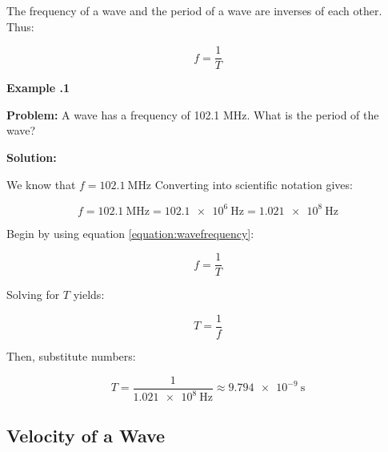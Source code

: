 	\newpage
	
	The frequency of a wave and the period of a wave are inverses of each other.  Thus:
	
	
	\begin{mdframed}[backgroundcolor=orange!20!white]
		\begin{equation}
		f = \frac{1}{T}
		\label{equation:wavefrequency}
		\end{equation}
	\end{mdframed}	
	
	
	
	\begin{mdframed}[backgroundcolor=blue!10!white]
		\begin{center}
			
			
			\textbf{Example \thesection.1}	
		\end{center}
		
		\textbf{Problem: }A wave has a frequency of 102.1 MHz.  What is the period of the wave?
		\vspace{0.1in}
		
		\textbf{Solution:} 
		
		We know that $f = \SI{102.1}{\mega\hertz} $ Converting into scientific notation gives:
		 
		 	
		 \begin{equation*}
		 f = \SI{102.1}{\mega\hertz} = \SI{102.1e6}{\hertz} = \boxed{ \SI{1.021e8}{\hertz}}
		 \end{equation*}
		 
		
		Begin by using equation \ref{equation:wavefrequency}:
		
		
		\begin{equation*}
		f = \frac{1}{T}
		\end{equation*}
		
		Solving for $T$ yields:
		
		\begin{equation*}
			T = \frac{1}{f}
		\end{equation*}		
		
		Then, substitute numbers: 
		
		\begin{equation*}
		T = \frac{1}{\SI{1.021e8}{\hertz}} \approx \boxed{\SI{9.794e-9}{\s}}
		\end{equation*}		
		
	\end{mdframed}
	
	\subsection{Velocity of a Wave}  
	

